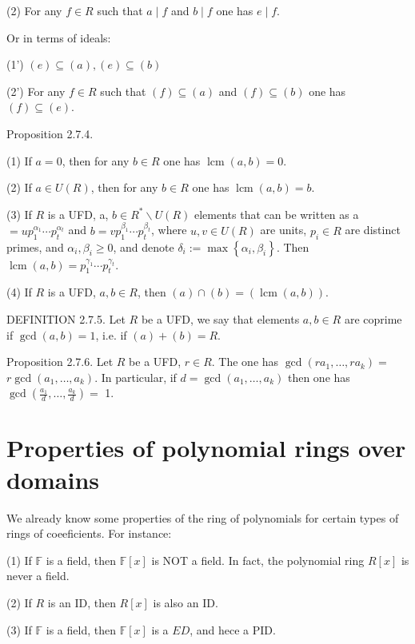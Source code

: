 (2) For any $f \in R$ such that $a \mid f$ and $b \mid f$ one has $e \mid f$.

Or in terms of ideals:

(1') $(e) \subseteq(a),(e) \subseteq(b)$

(2') For any $f \in R$ such that $(f) \subseteq(a)$ and $(f) \subseteq(b)$ one has $(f) \subseteq(e)$.

Proposition 2.7.4.

(1) If $a=0$, then for any $b \in R$ one has $\operatorname{lcm}(a, b)=0$.

(2) If $a \in U(R)$, then for any $b \in R$ one has $\operatorname{lcm}(a, b)=b$.

(3) If $R$ is a UFD, a, $b \in R^{*} \backslash U(R)$ elements that can be written as a $=u p_{1}^{\alpha_{1}} \cdots p_{t}^{\alpha_{t}}$ and $b=v p_{1}^{\beta_{1}} \cdots p_{t}^{\beta_{t}}$, where $u, v \in U(R)$ are units, $p_{i} \in R$ are distinct primes, and $\alpha_{i}, \beta_{i} \geq 0$, and denote $\delta_{i}:=\max \left\{\alpha_{i}, \beta_{i}\right\}$. Then $\operatorname{lcm}(a, b)=p_{1}^{\gamma_{1}} \cdots p_{t}^{\gamma_{t}}$.

(4) If $R$ is a UFD, $a, b \in R$, then $(a) \cap(b)=(\operatorname{lcm}(a, b))$.

DEFINITION 2.7.5. Let $R$ be a UFD, we say that elements $a, b \in R$ are coprime if $\operatorname{gcd}(a, b)=1$, i.e. if $(a)+(b)=R$.

Proposition 2.7.6. Let $R$ be a UFD, $r \in R$. The one has $\operatorname{gcd}\left(r a_{1}, \ldots, r a_{k}\right)=$ $r \operatorname{gcd}\left(a_{1}, \ldots, a_{k}\right)$. In particular, if $d=\operatorname{gcd}\left(a_{1}, \ldots, a_{k}\right)$ then one has $\operatorname{gcd}\left(\frac{a_{1}}{d}, \ldots, \frac{a_{k}}{d}\right)=$ 1.

\section{Properties of polynomial rings over domains}

We already know some properties of the ring of polynomials for certain types of rings of coeeficients. For instance:

(1) If $\mathbb{F}$ is a field, then $\mathbb{F}[x]$ is NOT a field. In fact, the polynomial ring $R[x]$ is never a field.

(2) If $R$ is an ID, then $R[x]$ is also an ID.

(3) If $\mathbb{F}$ is a field, then $\mathbb{F}[x]$ is a $E D$, and hece a PID.


